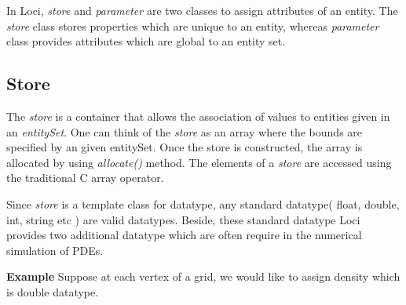 \par In Loci, {\em store} and {\em parameter} are two classes to assign
attributes of an entity. The {\em store } class stores properties which
are unique to an entity, whereas {\em parameter} class provides attributes
which are global to an entity set.

\subsection{Store}
The {\em store} is a container that allows the association of values
to entities given in an {\em entitySet}.  One can think of the {\em
store} as an array where the bounds are specified by an given
entitySet.  Once the store is constructed, the array is allocated by
using {\em allocate() } method. The elements of a {\em store} are 
accessed using the traditional C array operator. 

\par Since {\em store} is a template class for datatype, any standard datatype( 
float, double, int, string etc ) are valid datatypes. Beside, these standard datatype
Loci provides two additional datatype which are often require in the numerical simulation
of PDEs.

\par {\bf Example} Suppose at each vertex of a grid, we would like to assign density which
is double datatype. 

